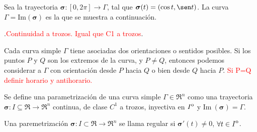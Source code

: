 \begin{example}
    Sea la trayectoria $\boldsymbol{\sigma}:[0,2\pi]\to\Gamma$, tal que $\boldsymbol{\sigma}(t)=(\cos t, \sen t)$. La curva $\Gamma=\text{Im}(\boldsymbol{\sigma})$ es la que se muestra a continuaci\'on.

    \begin{center}
    \end{center}
    
\end{example}

\begin{definition}
    .\textcolor{red}{Continuidad a trozos. Igual que C1 a trozos}.\final
\end{definition}

Cada curva simple $\Gamma$ tiene asociadas dos orientaciones o sentidos posibles. Si los puntos $P$ y $Q$ son los extremos de la curva, y $P\neq Q$, entonces podemos considerar a $\Gamma$ con orientaci\'on desde $P$ hacia $Q$ o bien desde $Q$ hacia $P$. \textcolor{red}{Si P=Q definir horario y antihorario.}

\begin{definition}
    Se define una parametrizaci\'on de una curva simple $\Gamma\in\Re^n$ como una trayectoria $\boldsymbol{\sigma}:I\subseteq\Re\to\Re^n$ continua, de clase $C^1$ a trozos, inyectiva en ${\kern0ptI}^{\mathrm{o}}$ y $\text{Im}\:(\boldsymbol{\sigma})=\Gamma$.\final
\end{definition}

\begin{definition}
    Una paremetrizaci\'on $\boldsymbol{\sigma}:I\subset\Re\to\Re^n$ se llama regular si $\boldsymbol{\sigma}'(t)\neq0$, $\forall t\in{\kern0ptI}^{\mathrm{o}}$.\final
\end{definition}